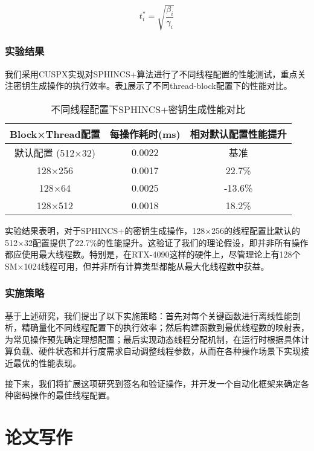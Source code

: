 \documentclass[report]{../../custom}
\begin{document}
\begin{equation}
t_i^* = \sqrt{\frac{\beta_i}{\gamma_i}}
\end{equation}

\subsubsection{实验结果}

我们采用CUSPX实现对SPHINCS+算法进行了不同线程配置的性能测试，重点关注密钥生成操作的执行效率。表\ref{tab:thread_comparison}展示了不同thread-block配置下的性能对比。

\begin{table}[htbp]
\centering
\caption{不同线程配置下SPHINCS+密钥生成性能对比}
\label{tab:thread_comparison}
\begin{tabular}{|c|c|c|}
  \hline
  \textbf{Block×Thread配置} & \textbf{每操作耗时(ms)} & \textbf{相对默认配置性能提升} \\
  \hline
  默认配置 (512×32) \cite{Wang2025} & 0.0022 & 基准 \\
  \hline
  128×256 & 0.0017 & 22.7\% \\
  \hline
  128×64 & 0.0025 & -13.6\% \\
  \hline
  128×512 & 0.0018 & 18.2\% \\
  \hline
\end{tabular}
\end{table}

实验结果表明，对于SPHINCS+的密钥生成操作，128×256的线程配置比默认的512×32配置提供了22.7\%的性能提升。这验证了我们的理论假设，即并非所有操作都应使用最大线程数。特别是，在RTX-4090这样的硬件上，尽管理论上有128个SM×1024线程可用，但并非所有计算类型都能从最大化线程数中获益。

\subsubsection{实施策略}

基于上述研究，我们提出了以下实施策略：首先对每个关键函数进行离线性能剖析，精确量化不同线程配置下的执行效率；然后构建函数到最优线程数的映射表，为常见操作预先确定理想配置；最后实现动态线程分配机制，在运行时根据具体计算负载、硬件状态和并行度需求自动调整线程参数，从而在各种操作场景下实现接近最优的性能表现。

接下来，我们将扩展这项研究到签名和验证操作，并开发一个自动化框架来确定各种密码操作的最佳线程配置。

\section{论文写作}
\end{document}
